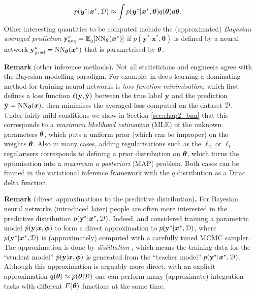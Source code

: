 \begin{equation}
p(\bm{y}^*|\bm{x}^*, \mathcal{D}) \approx \int p(\bm{y}^*|\bm{x}^*, \bm{\theta}) q(\bm{\theta}) d\bm{\theta}.
\label{eq:chap1_approx_predictive_distribution}
\end{equation}
Other interesting quantities to be computed include the (approximated) \emph{Bayesian averaged prediction} $\mathbf{y}^*_{\text{avg}} = \mathbb{E}_{q}[\text{NN}_{\bm{\theta}}(\bm{x}^*)]$ if $p(\bm{y}^*|\bm{x}^*, \bm{\theta})$ is defined by a neural network $\mathbf{y}^*_{\text{pred}} = \text{NN}_{\bm{\theta}}(\bm{x}^*)$ that is parametrised by $\bm{\theta}$.

\vspace{1em}
\begin{tcolorbox}
\textbf{Remark} (other inference methods)\textbf{.}
Not all statisticians and engineers agree with the Bayesian modelling paradigm. For example, in deep learning a dominating method for training neural networks is \emph{loss function minimisation}, which first defines a loss function $\ell(\mathbf{y}, \hat{\mathbf{y}})$ between the true label $\mathbf{y}$ and the prediction $\hat{\mathbf{y}} = \text{NN}_{\bm{\theta}}(\bm{x})$, then minimises the averaged loss computed on the dataset $\mathcal{D}$. Under fairly mild conditions we show in Section \ref{sec:chap2_bnn} that this corresponds to a \emph{maximum likelihood estimation} (MLE) \citep{fisher:mle1922} of the unknown parameters $\bm{\theta}$, which puts a uniform prior (which can be improper) on the weights $\bm{\theta}$. Also in many cases, adding regularisations such as the $\ell_2$ or $\ell_1$ regularisers corresponds to defining a prior distribution on $\bm{\theta}$, which turns the optimisation into a \emph{maximum a posteriori} (MAP) problem. Both cases can be framed in the variational inference framework with the $q$ distribution as a Dirac delta function.
\end{tcolorbox}

\vspace{1em}
\begin{tcolorbox}
\textbf{Remark} (direct approximations to the predictive distribution)\textbf{.}
For Bayesian neural networks (introduced later) people are often more interested in the predictive distribution $p(\mathbf{y}^* | \bm{x}^*, \mathcal{D})$. Indeed, \cite{snelson:compact2005} and \cite{korattikara:dark2015} considered training a parametric model $\hat{p}(\mathbf{y}| \bm{x}, \bm{\phi})$ to form a direct approximation to $p(\mathbf{y}^* | \bm{x}^*, \mathcal{D})$, where $p(\mathbf{y}^* | \bm{x}^*, \mathcal{D})$ is (approximately) computed with a carefully tuned MCMC sampler. The approximation is done by \emph{distillation} \citep{hinton:distil2015}, which means the training data for the ``student model'' $\hat{p}(\mathbf{y}| \bm{x}, \bm{\phi})$ is generated from the ``teacher model'' $p(\mathbf{y}^* | \bm{x}^*, \mathcal{D})$. Although this approximation is arguably more direct, with an explicit approximation $q(\bm{\theta}) \approx p(\bm{\theta} | \mathcal{D})$ one can perform many (approximate) integration tasks with different $F(\bm{\theta})$ functions at the same time.
\end{tcolorbox}

